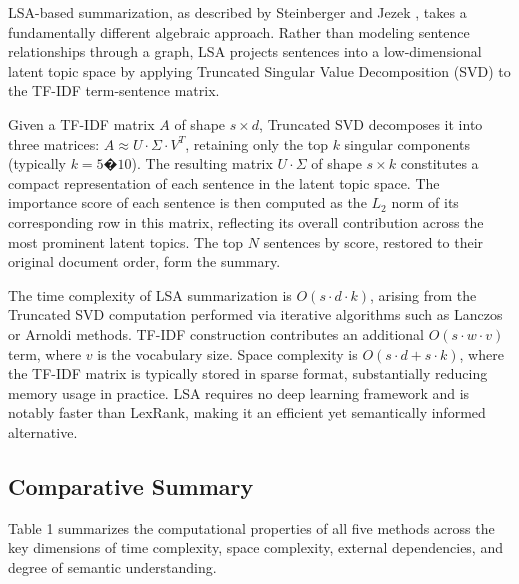 \documentclass[12pt,twoside,en,win]{bmzhart}
\begin{document}
	LSA-based summarization, as described by Steinberger and Jezek \cite{k8}, takes a fundamentally different 
	algebraic approach. Rather than modeling sentence relationships through a graph, LSA projects sentences 
	into a low-dimensional latent topic space by applying Truncated Singular Value Decomposition (SVD) to 
	the TF-IDF term-sentence matrix.

	Given a TF-IDF matrix $A$ of shape $s \times d$, Truncated SVD decomposes it into three matrices: 
	$A \approx U \cdot \Sigma \cdot V^T$, retaining only the top $k$ singular components (typically $k = 5$�$10$). 
	The resulting matrix $U \cdot \Sigma$ of shape $s \times k$ constitutes a compact representation of each sentence 
	in the latent topic space. The importance score of each sentence is then computed as the $L_2$ norm of its 
	corresponding row in this matrix, reflecting its overall contribution across the most prominent latent topics. 
	The top $N$ sentences by score, restored to their original document order, form the summary.

	The time complexity of LSA summarization is $O(s \cdot d \cdot k)$, arising from the Truncated SVD computation 
	performed via iterative algorithms such as Lanczos or Arnoldi methods. TF-IDF construction contributes an 
	additional $O(s \cdot w \cdot v)$ term, where $v$ is the vocabulary size. Space complexity is $O(s \cdot d + s \cdot k)$, 
	where the TF-IDF matrix is typically stored in sparse format, substantially reducing memory usage in practice. 
	LSA requires no deep learning framework and is notably faster than LexRank, making it an efficient yet semantically 
	informed alternative.

	\subsection{Comparative Summary}

	Table 1 summarizes the computational properties of all five methods across the key dimensions of time complexity, 
	space complexity, external dependencies, and degree of semantic understanding.
\end{document}
